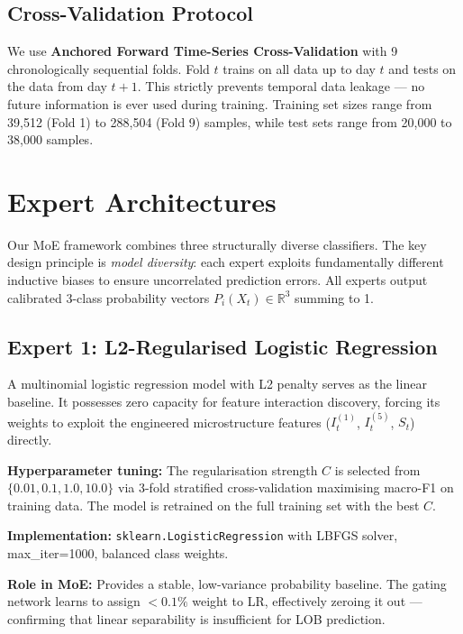 \documentclass[conference]{IEEEtran}
\begin{document}
\subsection{Cross-Validation Protocol}
We use \textbf{Anchored Forward Time-Series Cross-Validation} with 9
chronologically sequential folds. Fold $t$ trains on all data up to
day $t$ and tests on the data from day $t+1$. This strictly prevents
temporal data leakage --- no future information is ever used during
training. Training set sizes range from 39,512 (Fold 1) to 288,504
(Fold 9) samples, while test sets range from 20,000 to 38,000 samples.

\section{Expert Architectures}

Our MoE framework combines three structurally diverse classifiers. The
key design principle is \textit{model diversity}: each expert exploits
fundamentally different inductive biases to ensure uncorrelated prediction
errors. All experts output calibrated 3-class probability vectors
$P_i(X_t) \in \mathbb{R}^3$ summing to 1.

\subsection{Expert 1: L2-Regularised Logistic Regression}
A multinomial logistic regression model with L2 penalty serves as the
linear baseline. It possesses zero capacity for feature interaction
discovery, forcing its weights to exploit the engineered microstructure
features ($I_t^{(1)}$, $I_t^{(5)}$, $S_t$) directly.

\textbf{Hyperparameter tuning:} The regularisation strength $C$ is
selected from $\{0.01, 0.1, 1.0, 10.0\}$ via 3-fold stratified
cross-validation maximising macro-F1 on training data. The model is
retrained on the full training set with the best $C$.

\textbf{Implementation:} \texttt{sklearn.LogisticRegression} with LBFGS
solver, max\_iter=1000, balanced class weights.

\textbf{Role in MoE:} Provides a stable, low-variance probability
baseline. The gating network learns to assign $<0.1\%$ weight to LR,
effectively zeroing it out --- confirming that linear separability is
insufficient for LOB prediction.
\end{document}

